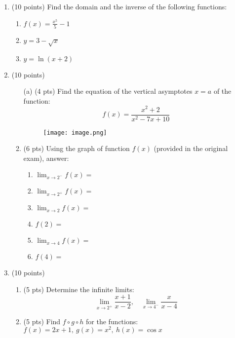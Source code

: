 \begin{enumerate}
    \item (10 points) Find the domain and the inverse of the following functions:
    \begin{enumerate}
        \item \( f(x) = \frac{x^5}{5} - 1 \)
        \item \( y = 3 - \sqrt{x} \)
        \item \( y = \ln(x + 2) \)
    \end{enumerate}

\item (10 points)
\begin{enumerate}
    \item[(a)] (4 pts) Find the equation of the vertical asymptotes \(x = a\) of the function:  
    \[
    f(x) = \frac{x^2 + 2}{x^2 - 7x + 10}
    \]
    \begin{figure}[ht!]
        \centering
        \texttt{[image: image.png]}
    \end{figure}

    \item (6 pts) Using the graph of function \( f(x) \) (provided in the original exam), answer:
        \begin{enumerate}
            \item \( \lim_{x \to 2^-} f(x) = \)
            \item \( \lim_{x \to 2^+} f(x) = \)
            \item \( \lim_{x \to 2} f(x) = \)
            \item \( f(2) = \)
            \item \( \lim_{x \to 4} f(x) = \)
            \item \( f(4) = \)
        \end{enumerate}
    \end{enumerate}

    \item (10 points)
    \begin{enumerate}
        \item (5 pts) Determine the infinite limits:
        \[
        \lim_{x \to 2^+} \frac{x + 1}{x - 2}, \quad 
        \lim_{x \to 4^-} \frac{x}{x - 4}
        \]

        \item (5 pts) Find \( f \circ g \circ h \) for the functions: \\
        \( f(x) = 2x + 1,\ g(x) = x^2,\ h(x) = \cos x \)
    \end{enumerate}


\end{enumerate}
